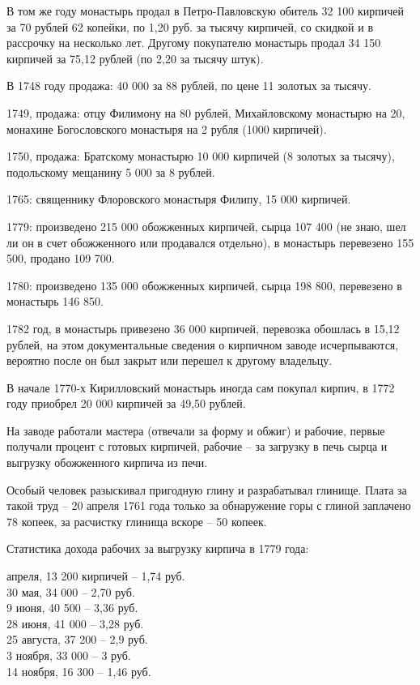 В том же году монастырь продал в Петро-Павловскую обитель 32 100 кирпичей за 70 рублей 62 копейки, по 1,20 руб. за тысячу кирпичей, со скидкой и в рассрочку на несколько лет. Другому покупателю монастырь продал 34 150 кирпичей за 75,12 рублей (по 2,20 за тысячу штук).

В 1748 году продажа: 40 000 за 88 рублей, по цене 11 золотых за тысячу.

1749, продажа: отцу Филимону на 80 рублей, Михайловскому монастырю на 20, монахине Богословского монастыря на 2 рубля (1000 кирпичей).

1750, продажа: Братскому монастырю 10 000 кирпичей (8 золотых за тысячу), подольскому мещанину 5 000 за 8 рублей.

1765: священнику Флоровского монастыря Филипу, 15 000 кирпичей.

1779: произведено 215 000 обожженных кирпичей, сырца 107 400 (не знаю, шел ли он в счет обожженного или продавался отдельно), в монастырь перевезено 155 500, продано 109 700.

1780: произведено 135 000 обожженных кирпичей, сырца 198 800, перевезено в монастырь 146 850.

1782 год, в монастырь привезено 36 000 кирпичей, перевозка обошлась в 15,12 рублей, на этом документальные сведения о кирпичном заводе исчерпываются, вероятно после он был закрыт или перешел к другому владельцу.

В начале 1770-х Кирилловский монастырь иногда сам покупал кирпич, в 1772 году приобрел 20 000 кирпичей за 49,50 рублей.

На заводе работали мастера (отвечали за форму и обжиг) и рабочие, первые получали процент с готовых кирпичей, рабочие – за загрузку в печь сырца и выгрузку обожженного кирпича из печи.

Особый человек разыскивал пригодную глину и разрабатывал глинище. Плата за такой труд – 20 апреля 1761 года только за обнаружение горы с глиной заплачено 78 копеек, за расчистку глинища вскоре – 50 копеек.

Статистика дохода рабочих за выгрузку кирпича в 1779 года: 

 апреля, 13 200 кирпичей – 1,74 руб.\\
30 мая, 34 000 – 2,70 руб.\\
9 июня, 40 500 – 3,36 руб.\\
28 июня, 41 000 – 3,28 руб.\\
25 августа, 37 200 – 2,9 руб.\\
3 ноября, 33 000 – 3 руб.\\
14 ноября, 16 300 – 1,46 руб.\\


